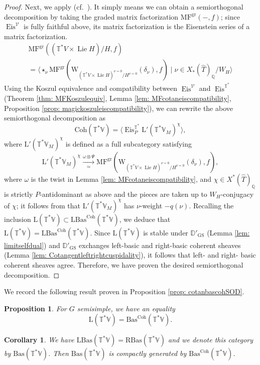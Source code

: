 \documentclass{amsart}
\newtheorem{proposition}[theorem]{Proposition}
\newtheorem{corollary}[theorem]{Corollary}
\theoremstyle{definition}
\theoremstyle{remark}
\numberwithin{equation}{section}
\DeclareMathOperator{\Lie}{Lie}
\newcommand{\mc}{\mathcal}
\newcommand{\Q}{\mathbb{Q}}
\newcommand{\wh}{\widehat}
\newcommand{\D}{\mathbb{D}}
\DeclareMathOperator{\Eis}{\mathrm{Eis}}
\newcommand{\Coh}{\mathrm{Coh}}
\newcommand{\GS}{\mathrm{GS}}
\newcommand{\V}{\mathbb{V}}
\newcommand{\T}{\mathbb{T}}
\newcommand{\RBas}{\mathrm{RBas}}
\newcommand{\LBas}{\mathrm{LBas}}
\newcommand{\Bas}{\mathrm{Bas}}
\DeclareMathOperator{\gr}{gr}
\newcommand{\MF}{\mathrm{MF}}
\newcommand{\mrL}{\mathrm{L}}
\begin{document}
\begin{proof}
Next, we apply \cite[Theorem 3.5.6]{BuPadurariuToda} (cf.~\cite[\S 4.4.1(i)]{BuPadurariuToda}). It simply means we can obtain a semiorthogonal decomposition by taking the graded matrix factorization $\MF^{\gr}(-,f)$; since $\Eis^{\mc V}$ is fully faithful above, its matrix factorization is the Eisenstein series of a matrix factorization. 
\begin{multline*}
\MF^{\gr}((\T^*V \times \Lie H)/H, f) \\
=\langle \star_\nu \MF^{\gr}(\mathrm{W}_{(\T^*V \times \Lie H)^{\nu=0}/H^{\nu=0}}(\delta_\nu), f)\mid \nu \in X_*(\wh T)_\Q / W_H\rangle    
\end{multline*}
Using the Koszul equivalence and compatibility between $\Eis^{\mc V}$ and $\Eis^{\T^*}$ (Theorem \ref{thm: MFKoszulequiv}, Lemma \ref{lem: MFcotaneiscompatibility}, Proposition \ref{prop: magickoszuleiscompatibility}), we can rewrite the above semiorthogonal decomposition as
\[
\Coh(\T^*\V)=\langle \Eis^{\T^*}_P \mrL'(\T^*\V_M)^{\chi} \rangle, 
\]
where $\mrL'(\T^*\V_M)^{\chi}$ is defined as a full subcategory satisfying
\[
\mrL'(\T^*\V_M)^{\chi} \xrightarrow[\simeq]{\omega\otimes\Psi}\MF^{\gr}(\mathrm{W}_{(\T^*V \times \Lie H)^{\nu=0}/H^{\nu=0}}(\delta_\nu), f),
\]
where $\omega$ is the twist in Lemma \ref{lem: MFcotaneiscompatibility}, and $\chi\in X^*(\wh T)_\Q$ is strictly $P$-antidominant as above and the pieces are taken up to $W_H$-conjugacy of $\chi$; it follows from \cite[(2.1.6.2)]{BuPadurariuToda} that $\mrL'(\T^*\V_M)^{\chi}$ has $\nu$-weight $-q(\nu)$. 
Recalling the inclusion $\mrL(\T^*\V)\subset \LBas^\Coh(\T^*\V)$, we deduce that $\mrL(\T^*\V)=\LBas^\Coh(\T^*\V)$. Since $\mrL(\T^*\V)$ is stable under $\D'_\GS$ (Lemma \ref{lem: limitselfdual}) and $\D'_\GS$ exchanges left-basic and right-basic coherent sheaves (Lemma \ref{lem: Cotangentleftrightcuspidality}), it follows that left- and right- basic coherent sheaves agree. Therefore, we have proven the desired semiorthogonal decomposition.  
\end{proof}

We record the following result proven in Proposition \ref{prop: cotanbascohSOD}.
\begin{proposition}{\label{prop: lim=bas}}
    For $G$ semisimple, we have an equality
    \begin{equation*}
        \mrL(\T^{\ast}\V) = \Bas^{\Coh}(\T^{\ast}\V).
    \end{equation*}
\end{proposition}

\begin{corollary}{\label{cor: LBas=RBasTV}}
We have $\LBas(\T^{\ast}\V) = \RBas(\T^{\ast}\V)$ and we denote this category by $\Bas(\T^{\ast}\V)$. Then $\Bas(\T^{\ast}\V)$ is compactly generated by $\Bas^{\Coh}(\T^{\ast}\V)$.
\end{corollary}
\end{document}
